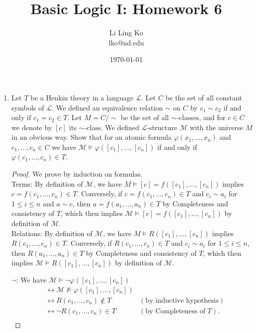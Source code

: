 \documentclass{article}
\begin{document}
\title{Basic Logic I: Homework 6}
\author{Li Ling Ko\\ lko@nd.edu}
\date{\today}
\maketitle

\begin{enumerate}[label={\bf Q\arabic*:}]
  \item Let $T$ be a Henkin theory in a language $\mathcal{L}$. Let $C$ be
    the set of all constant symbols of $\mathcal{L}$. We defined an
    equivalence relation $\sim$ on $C$ by $c_1\sim c_2$ if and only if
    $c_1=c_2\in T$. Let $M=C/\sim$ be the set of all $\sim$-classes, and
    for $c\in C$ we denote by $[c]$ its $\sim$-class. We defined
    $\mathcal{L}$-structure $\mathcal{M}$ with the universe $M$ in an
    obvious way. Show that for an atomic formula
    $\varphi(x_1,\ldots,x_n)$ and $c_1,\ldots,c_n\in C$ we have
    $\mathcal{M}\models\varphi([c_1],\ldots,[c_n])$ if and only if
    $\varphi(c_1,\ldots,c_n)\in T$.

    \begin{proof}
      We prove by induction on formulas. \\

      Terms: By definition of $\mathcal{M}$, we have $M\models
      [c]=f([c_1],\ldots,[c_n])$ implies $c=f(c_1,\ldots,c_n)\in T$.
      Conversely, if $c=f(c_1,\ldots,c_n)\in T$ and
      $c_i\sim a_i$ for $1\leq i\leq n$ and $a\sim c$, then
      $a=f(a_1,\ldots,a_n)\in T$ by Completeness and consistency of $T$,
      which then implies $\mathcal{M}\models [c]=f([c_1],\ldots,[c_n])$ by
      definition of $\mathcal{M}$. \\

      Relations: By definition of $\mathcal{M}$, we have $M\models
      R([c_1],\ldots,[c_n])$ implies $R(c_1,\ldots,c_n)\in T$. Conversely,
      if $R(c_1,\ldots,c_n)\in T$ and $c_i\sim a_i$
      for $1\leq i\leq n$, then $R(a_1,\ldots,a_n)\in T$ by Completeness
      and consistency of $T$, which then implies $\mathcal{M}\models
      R([c_1],\ldots,[c_n])$ by definition of $\mathcal{M}$.

      $\neg$: We have $\mathcal{M}\models\neg\varphi([c_1],\ldots,[c_n])$
      \begin{align*}
          &\leftrightarrow
            \mathcal{M}\not\models\varphi([c_1],\ldots,[c_n]) &\\
          &\leftrightarrow R(c_1,\ldots,c_n)\not\in T & (\text{by inductive
            hypothesis}) \\
          &\leftrightarrow \neg R(c_1,\ldots,c_n)\in T & (\text{by
            Completeness of}\; T). \\
      \end{align*}


\end{proof}
\end{enumerate}
\end{document}
